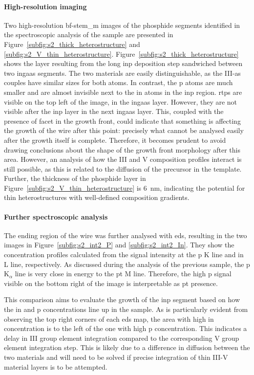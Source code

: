 \paragraph{High-resolution imaging} Two high-resolution \acs{bf}-\acs{stem_m} images of the phosphide segments identified in the spectroscopic analysis of the sample are presented in Figure~\ref{subfig:s2_thick_heterostructure} and \ref{subfig:s2_V_thin_heterostructure}. Figure~\ref{subfig:s2_thick_heterostructure} shows the layer resulting from the long \acs{inp} deposition step sandwiched between two \acs{ingaas} segments. The two materials are easily distinguishable, as the III-\acs{as} couples have similar sizes for both atoms. In contrast, the \acl{p} atoms are much smaller and are almost invisible next to the \acl{in} atoms in the \acs{inp} region. \acl{rtp}s are visible on the top left of the image, in the \acs{ingaas} layer. However, they are not visible after the \acs{inp} layer in the next \acs{ingaas} layer. This, coupled with the presence of  facet in the growth front, could indicate that something is affecting the growth of the wire after this point: precisely what cannot be analysed easily after the growth itself is complete. Therefore, it becomes prudent to avoid drawing conclusions about the shape of the growth front morphology after this area. However, an analysis of how the III and V composition profiles interact is still possible, as this is related to the diffusion of the precursor in the template. Further, the thickness of the phosphide layer in Figure~\ref{subfig:s2_V_thin_heterostructure} is \qty{6}{nm}, indicating the potential for thin heterostructures with well-defined composition gradients.

\paragraph{Further spectroscopic analysis} The ending region of the wire was further analysed with \acs{eds}, resulting in the two images in Figure~\ref{subfig:s2_int2_P} and \ref{subfig:s2_int2_In}. They show the concentration profiles calculated from the signal intensity at the \acl{p} K line and \acl{in} L line, respectively. As discussed during the analysis of the previous sample, the \acl{p} K\(_\alpha\) line is very close in energy to the \acl{pt} M line. Therefore, the high \acl{p} signal visible on the bottom right of the image is interpretable as \acl{pt} presence. 

This comparison aims to evaluate the growth of the \acs{inp} segment based on how the \acl{in} and \acl{p} concentrations line up in the sample. As is particularly evident from observing the top right corners of each \acs{eds} map, the area with high \acl{in} concentration is to the left of the one with high \acl{p} concentration. This indicates a delay in III group element integration compared to the corresponding V group element integration step. This is likely due to a difference in diffusion between the two materials and will need to be solved if precise integration of thin III-V material layers is to be attempted.

